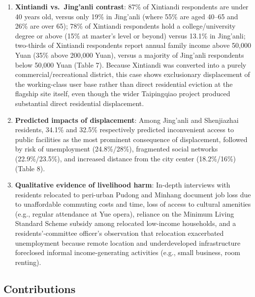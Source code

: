 \begin{enumerate}
  \item \textbf{Xintiandi vs.\ Jing'anli contrast}: 87\% of Xintiandi respondents are under 40 years old, versus only 19\% in Jing'anli (where 55\% are aged 40--65 and 26\% are over 65); 78\% of Xintiandi respondents hold a college/university degree or above (15\% at master's level or beyond) versus 13.1\% in Jing'anli; two-thirds of Xintiandi respondents report annual family income above 50,000 Yuan (35\% above 200,000 Yuan), versus a majority of Jing'anli respondents below 50,000 Yuan (Table 7). Because Xintiandi was converted into a purely commercial/recreational district, this case shows exclusionary displacement of the working-class user base rather than direct residential eviction at the flagship site itself, even though the wider Taipingqiao project produced substantial direct residential displacement.
  \item \textbf{Predicted impacts of displacement}: Among Jing'anli and Shenjiazhai residents, 34.1\% and 32.5\% respectively predicted inconvenient access to public facilities as the most prominent consequence of displacement, followed by risk of unemployment (24.8\%/28\%), fragmented social networks (22.9\%/23.5\%), and increased distance from the city center (18.2\%/16\%) (Table 8).
  \item \textbf{Qualitative evidence of livelihood harm}: In-depth interviews with residents relocated to peri-urban Pudong and Minhang document job loss due to unaffordable commuting costs and time, loss of access to cultural amenities (e.g., regular attendance at Yue opera), reliance on the Minimum Living Standard Scheme subsidy among relocated low-income households, and a residents'-committee officer's observation that relocation exacerbated unemployment because remote location and underdeveloped infrastructure foreclosed informal income-generating activities (e.g., small business, room renting).
\end{enumerate}

\subsection*{Contributions}

